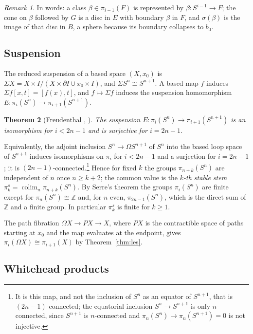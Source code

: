 \documentclass[11pt]{amsart}
\numberwithin{equation}{section}
\theoremstyle{plain}
\newtheorem{theorem}{Theorem}[section]
\theoremstyle{definition}
\theoremstyle{remark}
\newtheorem{remark}[theorem]{Remark}
\newcommand{\Z}{\mathbb{Z}}
\begin{document}
\begin{remark}
In words: a class $\beta\in\pi_{i-1}(F)$ is represented by $\beta\colon S^{i-1}\to F$; the cone on $\beta$ followed by $G$ is a disc in $E$ with boundary $\beta$ in $F$, and $\sigma(\beta)$ is the image of that disc in $B$, a sphere because its boundary collapses to $b_0$.
\end{remark}

\subsection{Suspension}

The reduced suspension of a based space $(X,x_0)$ is $\Sigma X=X\times I/(X\times\partial I\cup x_0\times I)$, and $\Sigma S^n\cong S^{n+1}$. A based map $f$ induces $\Sigma f[x,t]=[f(x),t]$, and $f\mapsto\Sigma f$ induces the suspension homomorphism $E\colon\pi_i(S^n)\to\pi_{i+1}(S^{n+1})$.

\begin{theorem}[Freudenthal {\cite{Fre38}}, {\cite[Corollary~4.24]{Hat02}}]\label{thm:freudenthal}
The suspension $E\colon\pi_i(S^n)\to\pi_{i+1}(S^{n+1})$ is an isomorphism for $i<2n-1$ and is surjective for $i=2n-1$.
\end{theorem}

Equivalently, the adjoint inclusion $S^n\to\Omega S^{n+1}$ of $S^n$ into the based loop space of $S^{n+1}$ induces isomorphisms on $\pi_i$ for $i<2n-1$ and a surjection for $i=2n-1$; it is $(2n-1)$-connected.\footnote{It is this map, and not the inclusion of $S^n$ as an equator of $S^{n+1}$, that is $(2n-1)$-connected; the equatorial inclusion $S^n\to S^{n+1}$ is only $n$-connected, since $S^{n+1}$ is $n$-connected and $\pi_{n}(S^n)\to\pi_n(S^{n+1})=0$ is not injective.} Hence for fixed $k$ the groups $\pi_{n+k}(S^n)$ are independent of $n$ once $n\ge k+2$; the common value is the \emph{$k$-th stable stem} $\pi_k^s=\operatorname{colim}_n\pi_{n+k}(S^n)$. By Serre's theorem \cite{Ser53} the groups $\pi_i(S^n)$ are finite except for $\pi_n(S^n)\cong\Z$ and, for $n$ even, $\pi_{2n-1}(S^n)$, which is the direct sum of $\Z$ and a finite group. In particular $\pi_k^s$ is finite for $k\ge1$.

The path fibration $\Omega X\to PX\to X$, where $PX$ is the contractible space of paths starting at $x_0$ and the map evaluates at the endpoint, gives $\pi_i(\Omega X)\cong\pi_{i+1}(X)$ by Theorem~\ref{thm:les}.

\subsection{Whitehead products}
\end{document}
